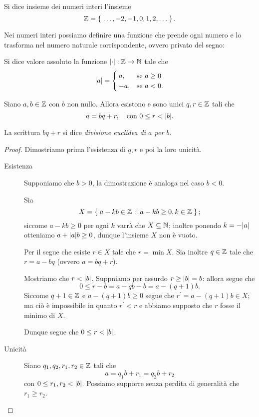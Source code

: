 \begin{definition}
    Si dice insieme dei numeri interi l'insieme \[
        \Z = \set{\dots, -2, -1, 0, 1, 2, \dots}.    
    \]
\end{definition}

Nei numeri interi possiamo definire una funzione che prende ogni numero e lo trasforma nel numero naturale corrispondente, ovvero privato del segno:
\begin{definition}
    Si dice valore assoluto la funzione $\abs*{\cdot} : \Z \to \N$ tale che \[
        \abs*{a} = \begin{cases}
            a, &\text{se } a \geq 0\\
            -a, &\text{se } a < 0.
        \end{cases}    
    \]
\end{definition}

\begin{theorem}
    Siano $a, b \in \Z$ con $b$ non nullo. Allora esistono e sono unici $q, r \in \Z$ tali che \[
        a = bq + r, \quad \text{con } 0 \leq r < \abs*{b}.    
    \]

    La scrittura $bq + r$ si dice \emph{divisione euclidea di $a$ per $b$}.
\end{theorem}
\begin{proof}
    Dimostriamo prima l'esistenza di $q, r$ e poi la loro unicità.
    \begin{description}
        \item[Esistenza] Supponiamo che $b > 0$, la dimostrazione è analoga nel caso $b < 0$. 
        
        Sia \[
            X = \set{a - kb \in \Z \suchthat a-kb \geq 0, k \in \Z};
        \] siccome $a-kb \geq 0$ per ogni $k$ varrà che $X \subseteq \N$; inoltre ponendo $k = -\abs*{a}$ otteniamo $a+ \abs*{a}b \geq 0$, dunque l'insieme $X$ non è vuoto.

        Per il  segue che esiste $r \in X$ tale che $r = \min X$. Sia inoltre $q \in \Z$ tale che $r = a - bq$ (ovvero $a = bq + r$).

        Mostriamo che $r < \abs*{b}$. Suppniamo per assurdo $r \geq \abs*{b} = b$: allora segue che \[
            0 \leq r - b = a - qb - b = a - (q+1)b.   
        \] Siccome $q+1 \in \Z$ e $a - (q+1)b \geq 0$ segue che $r^\prime = a-(q+1)b \in X$; ma ciò è impossibile in quanto $r^\prime < r$ e abbiamo supposto che $r$ fosse il minimo di $X$.

        Dunque segue che $0 \leq r < \abs*{b}$.
        \item[Unicità] Siano $q_1, q_2, r_1, r_2 \in \Z$ tali che \[
            a = q_1b + r_1 = q_2b + r_2    
        \] con $0 \leq r_1, r_2 < \abs*{b}$. Possiamo supporre senza perdita di generalità che $r_1 \geq r_2$.
        
    \end{description}
\end{proof}